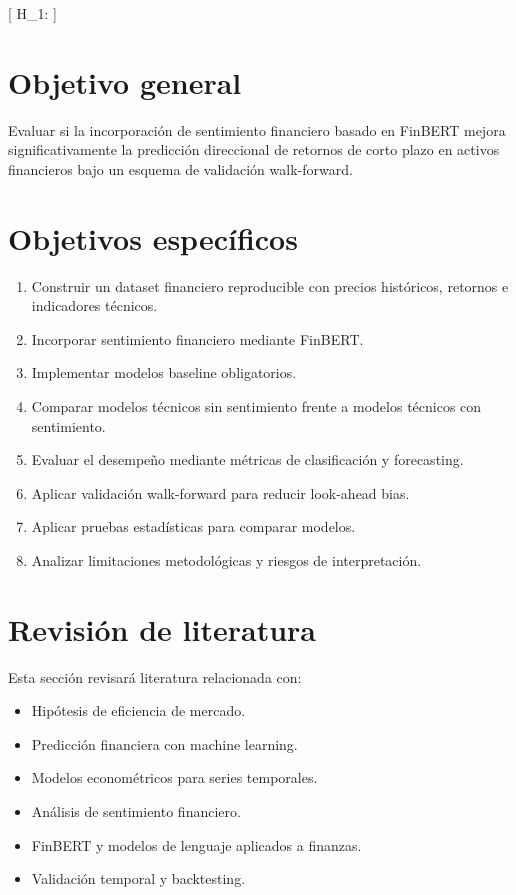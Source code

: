 \documentclass[12pt,a4paper]{article}
\begin{document}
[
H_1: 
]

\section{Objetivo general}

Evaluar si la incorporación de sentimiento financiero basado en FinBERT mejora significativamente la predicción direccional de retornos de corto plazo en activos financieros bajo un esquema de validación walk-forward.

\section{Objetivos específicos}

\begin{enumerate}
\item Construir un dataset financiero reproducible con precios históricos, retornos e indicadores técnicos.
\item Incorporar sentimiento financiero mediante FinBERT.
\item Implementar modelos baseline obligatorios.
\item Comparar modelos técnicos sin sentimiento frente a modelos técnicos con sentimiento.
\item Evaluar el desempeño mediante métricas de clasificación y forecasting.
\item Aplicar validación walk-forward para reducir look-ahead bias.
\item Aplicar pruebas estadísticas para comparar modelos.
\item Analizar limitaciones metodológicas y riesgos de interpretación.
\end{enumerate}

\section{Revisión de literatura}

Esta sección revisará literatura relacionada con:

\begin{itemize}
\item Hipótesis de eficiencia de mercado.
\item Predicción financiera con machine learning.
\item Modelos econométricos para series temporales.
\item Análisis de sentimiento financiero.
\item FinBERT y modelos de lenguaje aplicados a finanzas.
\item Validación temporal y backtesting.
\end{itemize}
\end{document}
